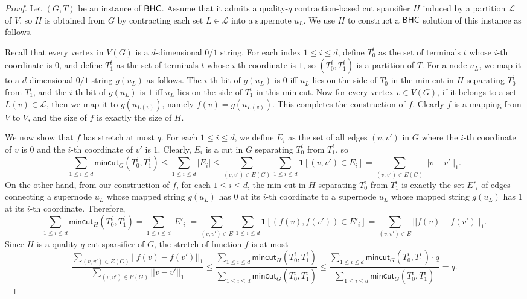 \documentclass[11pt]{article}
\theoremstyle{definition}
\newcommand{\lset}{{\mathcal{L}}}
\newcounter{note}
\newcommand{\mc}{\mathsf{mincut}}
\begin{document}
\begin{proof}
Let $(G,T)$ be an instance of $\textnormal{\textsf{BHC}}$. Assume that it admits a quality-$q$ contraction-based cut sparsifier $H$ induced by a partition $\lset$ of $V$, so $H$ is obtained from $G$ by contracting each set $L\in \lset$ into a supernote $u_L$.
We use $H$ to construct a $\textnormal{\textsf{BHC}}$ solution of this instance as follows.

Recall that every vertex in $V(G)$ is a $d$-dimensional $0/1$ string. For each index $1\le i\le d$, define $T^i_0$ as the set of terminals $t$ whose $i$-th coordinate is $0$, and define $T^i_1$ as the set of terminals $t$ whose $i$-th coordinate is $1$, so $(T^i_0,T^i_1)$ is a partition of $T$. For a node $u_L$, we map it to a $d$-dimensional $0/1$ string $g(u_L)$ as follows. The $i$-th bit of $g(u_L)$ is $0$ iff $u_L$ lies on the side of $T^i_0$ in the min-cut in $H$ separating $T^i_0$ from $T^i_1$, and the $i$-th bit of $g(u_L)$ is $1$ iff $u_L$ lies on the side of $T^i_1$ in this min-cut.
Now for every vertex $v\in V(G)$, if it belongs to a set $L(v)\in \lset$, then we map it to $g(u_{L(v)})$, namely $f(v)=g(u_{L(v)})$. This completes the construction of $f$. Clearly $f$ is a mapping from $V$ to $V$, and the size of $f$ is exactly the size of $H$.

We now show that $f$ has stretch at most $q$.
For each $1\le i\le d$, we define $E_i$ as the set of all edges $(v,v')$ in $G$ where the $i$-th coordinate of $v$ is $0$ and the $i$-th coordinate of $v'$ is $1$. Clearly, $E_i$ is a cut in $G$ separating $T^i_0$ from $T^i_1$, so
\[
\sum_{1\le i\le d}\mc_G(T^i_0,T^i_1)\le \sum_{1\le i\le d}|E_i|\le \sum_{(v,v')\in E(G)}\sum_{1\le  i\le d}\mathbf{1}[(v,v')\in E_i]=\sum_{(v,v')\in E(G)}||v-v'||_1.
\]
On the other hand, from our construction of $f$, for each $1\le i\le d$, the min-cut in $H$ separating $T^i_0$ from $T^i_1$ is exactly the set $E'_i$ of edges connecting a supernode $u_L$ whose mapped string $g(u_L)$ has $0$ at its $i$-th coordinate to a supernode $u_L$ whose mapped string $g(u_L)$ has $1$ at its $i$-th coordinate. Therefore, 
\[
\sum_{1\le i\le d}\mc_H(T^i_0,T^i_1)= \sum_{1\le i\le d}|E'_i|= \sum_{(v,v')\in E}\sum_{1\le  i\le d}\mathbf{1}[(f(v),f(v'))\in E'_i]=\sum_{(v,v')\in E}||f(v)-f(v')||_1.
\]
Since $H$ is a quality-$q$ cut sparsifier of $G$, the stretch of function $f$ is at most
\[
\frac{\sum_{(v,v')\in E(G)}||f(v)-f(v')||_1}{\sum_{(v,v')\in E(G)}||v-v'||_1}\le \frac{\sum_{1\le i\le d}\mc_H(T^i_0,T^i_1)}{\sum_{1\le i\le d}\mc_G(T^i_0,T^i_1)}\le \frac{\sum_{1\le i\le d} \mc_G(T^i_0,T^i_1)\cdot q}{\sum_{1\le i\le d}\mc_G(T^i_0,T^i_1)}=q.
\]
\end{proof}
\end{document}
